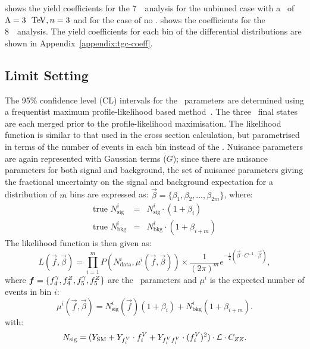 shows the yield coefficients for the 7~\tev\ analysis for the
unbinned case with a \formfactor\ of $\Lambda=3~\tev, n=3$ and for the case of
no \formfactor. shows the coefficients for the 8~\tev\
analysis. The yield coefficients for each bin of the differential distributions
are shown in Appendix~\ref{appendix:tgc-coeff}.

\subsection{Limit Setting}

The 95\% confidence level (CL) intervals for the \TGC\ parameters are determined
using a frequentist maximum profile-likelihood based method~\cite{Cowan:2010js}.
The three \lllplp\ final states are each merged prior to
the profile-likelihood maximisation. The likelihood function is similar
to that used in the cross section calculation, but parametrised in terms of the
number of events in each bin instead of the \cx.  Nuisance parameters are
again represented with Gaussian terms ($G$); since there are nuisance
parameters for both signal and background, the set of nuisance parameters giving
the fractional uncertainty on the signal and background expectation for a
distribution of $m$ bins are expressed as:
$\vec\beta = \{\beta_1, \beta_2, \ldots, \beta_{2m}\}$, where:
\begin{eqnarray}
\text{true }N_\mathrm{sig}^i &=& N_\mathrm{sig}^i \cdot (1 + \beta_i) \label{nuis1}\\
\text{true }N_\mathrm{bkg}^i &=& N_\mathrm{bkg}^i \cdot (1 + \beta_{i+m}) \label{nuis2}
\end{eqnarray}
The likelihood function is then given as:
\begin{equation}
L(\vec{f}, \vec{\beta}) =
\prod_{i=1}^{m}P(N_\mathrm{data}^i,\mu^i(\vec{f},\vec\beta))
\times
\frac{1}{(2\pi)^m}e^{-\frac{1}{2}\left(\vec\beta\cdot C^{-1}\cdot\vec\beta\right)},
\label{likelihood}
\end{equation}
where $\boldsymbol{f}=\{f_{4}^{\gamma}, f_{4}^{Z}, f_{5}^{\gamma}, f_{5}^{Z} \}$ are the \TGC\
parameters and $\mu^{i}$ is the expected number of events in bin $i$:
\begin{equation}
\mu^i(\vec{f},\vec{\beta})
= N_\mathrm{sig}^i(\vec{f})(1 + \beta_i) + N_\mathrm{bkg}^i(1 + \beta_{i+m}).
\end{equation}
with:
\begin{equation}
N_{\rm sig} = (Y_\mathrm{\rm SM} + Y_{f_i^V}\cdot f_i^V + Y_{f_i^Vf_i^V}\cdot (f_i^V)^2)\cdot\mathcal{L}\cdot{C_{ZZ}}.
\end{equation}

